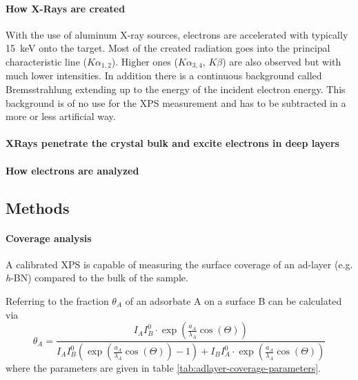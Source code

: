 	\paragraph{How X-Rays are created}
	With the use of aluminum X-ray sources, electrons are accelerated with typically \SI{15}{\keV} onto the target. Most of the created radiation goes into the principal characteristic line ($K\alpha_{1,2}$). Higher ones ($K\alpha_{3,4}$, $K\beta$) are also observed but with much lower intensities. In addition there is a continuous background called Bremsstrahlung extending up to the energy of the incident electron energy. This background is of no use for the XPS measurement and has to be subtracted in a more or less artificial way.
	\paragraph{XRays penetrate the crystal bulk and excite electrons in deep layers}
	\paragraph{How electrons are analyzed}
\subsection{Methods}
	\paragraph{Coverage analysis}
	
	A calibrated XPS is capable of measuring the surface coverage of an ad-layer (e.g. \textit{h}-BN) compared to the bulk of the sample. 
	
	Referring to \cite{ertl_low_1986} the fraction $\theta_A$ of an adsorbate A on a surface B can be calculated via
	\begin{equation}\label{eq:adlayer-coverage}
	\theta_A=\frac{I_AI_B^0\cdot \exp(\frac{a_A}{\lambda_A}\cos(\Theta))}{I_AI_B^0( \exp(\frac{a_A}{\lambda_A}\cos(\Theta))-1)+I_BI_A^0\cdot \exp(\frac{a_A}{\lambda_A}\cos(\Theta))}
	\end{equation}
	where the parameters are given in table \ref{tab:adlayer-coverage-parameters}.
	
